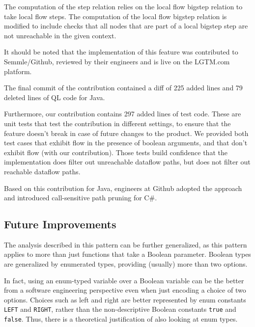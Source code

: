 The computation of the step relation relies on the local flow bigstep relation
to take local flow steps.
The computation of the local flow bigstep relation is modified to include checks 
that all nodes that are part of a local bigstep step are not unreachable in the 
given context.


It should be noted that the implementation of this feature was contributed to Semmle/Github,
reviewed by their engineers and is live on the LGTM.com platform.

The final commit of the contribution contained a diff of 225 added lines and 
79 deleted lines of QL code for Java.

Furthermore, our contribution contains 297 added lines of test code.
These are unit tests that test the contribution in different settings, to ensure 
that the feature doesn't break in case of future changes to the product.
We provided both test cases that exhibit flow in the presence of boolean 
arguments, and that don't exhibit flow (with our contribution).
Those tests build confidence that the implementation does filter out unreachable 
dataflow paths, but does not filter out reachable dataflow paths.

Based on this contribution for Java, engineers at Github adopted 
the approach and introduced call-sensitive path pruning for C\#.

\subsection{Future Improvements}
The analysis described in this pattern can be further generalized, as
this pattern applies to more than just functions that take a Boolean parameter.
Boolean types are generalized by enumerated types, providing (usually) more than two options.

In fact, using an enum-typed variable over a Boolean variable can be the better
 from a software engineering perspective
even when just encoding a choice of two options.
Choices such as left and right are better represented 
by enum constants \texttt{LEFT} and \texttt{RIGHT}, rather than the 
non-descriptive Boolean constants \texttt{true} and \texttt{false}.
Thus, there is a theoretical justification of also looking at enum types.

